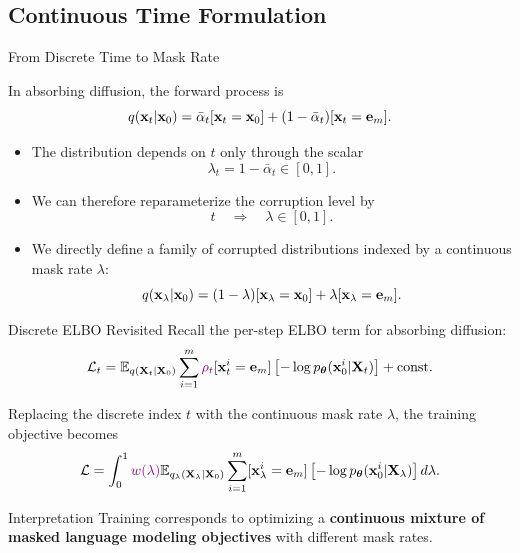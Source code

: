 \documentclass{beamer}
\renewcommand{\eqpause}{}
\begin{document}
\subsection{Continuous Time Formulation}
\begin{frame}{From Discrete Time to Mask Rate}

    In absorbing diffusion, the forward process is
    \[
        q(\mathbf{x}_t | \mathbf{x}_0) =
        \bar\alpha_t[\mathbf{x}_t=\mathbf{x}_0]
        +
        (1-\bar\alpha_t)[\mathbf{x}_t=\mathbf{e}_m].
    \]
	\vspace{-0.5cm}
    \eqpause
	\begin{itemize}
		\item The distribution depends on $t$ only through the scalar
		\[
			\lambda_t = 1-\bar\alpha_t \in [0,1].
		\]
		\vspace{-0.5cm}
    	\eqpause
		\item We can therefore reparameterize the corruption level by
		\[
			t \quad \Rightarrow \quad \lambda \in [0,1].
		\]
		\vspace{-0.5cm}
		\eqpause
		\item We directly define a family of corrupted distributions indexed by
		a continuous mask rate $\lambda$:
		\[
			q(\mathbf{x}_\lambda | \mathbf{x}_0) =
			(1-\lambda)[\mathbf{x}_{\lambda}=\mathbf{x}_0]
			+ \lambda[\mathbf{x}_{\lambda}=\mathbf{e}_m].
		\]
	\end{itemize}
\end{frame}
\begin{frame}{Discrete ELBO Revisited}
    Recall the per-step ELBO term for absorbing diffusion:
    \[
        \mathcal{L}_t
        =
        \mathbb{E}_{q(\mathbf{X}_t | \mathbf{X}_0)}
        \sum_{i=1}^m
        {\color{violet}\rho_t}[\mathbf{x}_t^i=\mathbf e_m]
        \left[-\log p_{\boldsymbol{\theta}}(\mathbf{x}_0^i | \mathbf{X}_t)\right]
        + \text{const}.
    \]
    \eqpause
    Replacing the discrete index $t$ with the continuous mask rate $\lambda$,
    the training objective becomes
    \[
        \mathcal L
        =
        \int_0^1
       {\color{violet} w(\lambda)}
        \mathbb{E}_{q_\lambda(\mathbf{X}_\lambda | \mathbf{X}_0)}
        \sum_{i=1}^m
        [\mathbf{x}_\lambda^i=\mathbf e_m]
        \left[-\log p_{\boldsymbol{\theta}}(\mathbf{x}_0^i | \mathbf{X}_\lambda)\right] 
		d\lambda.
    \]
    \eqpause
	\begin{block}{Interpretation}
        Training corresponds to optimizing a \textbf{continuous mixture of
        masked language modeling objectives} with different mask rates.
    \end{block}
\end{frame}
\end{document}
